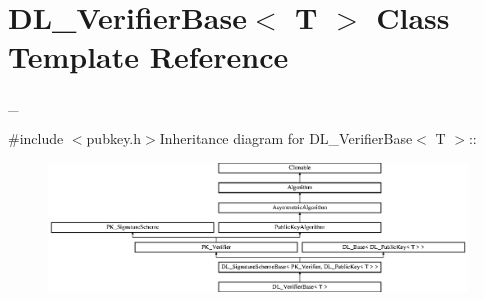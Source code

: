 \hypertarget{class_d_l___verifier_base}{
\section{DL\_\-VerifierBase$<$ T $>$ Class Template Reference}
\label{class_d_l___verifier_base}
}


\_\-  


{\ttfamily \#include $<$pubkey.h$>$}Inheritance diagram for DL\_\-VerifierBase$<$ T $>$::\begin{figure}[H]
\begin{center}
\leavevmode
\includegraphics[height=3.4386cm]{class_d_l___verifier_base}
\end{center}
\end{figure}
